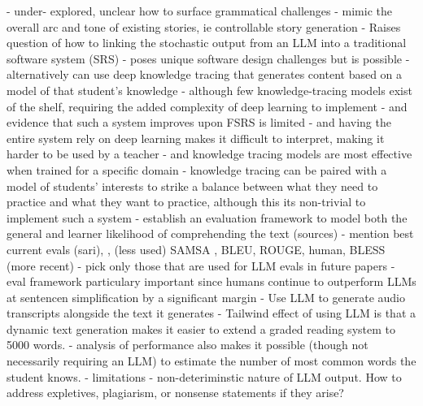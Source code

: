 \documentclass[
	letterpaper, %
]{jdf}
\begin{document}
      - under- explored, unclear how to surface grammatical challenges
    - mimic the overall arc and tone of existing stories, ie controllable story generation \cite{controllable_story_generation}
  - Raises question of how to linking the stochastic output from an LLM into a traditional software system (SRS)
    - poses unique software design challenges but is possible \cite{taiwan_adaptive_testing}
    - alternatively can use deep knowledge tracing \cite{deep_knowledge_tracing} that generates content based on a model of that student's knowledge
      - although few knowledge-tracing models exist of the shelf, requiring the added complexity of deep learning to implement \cite{question_generation_adaptive_education, generative_information_retrieval}
        - and evidence that such a system improves upon FSRS is limited \cite{flashcard_scheduler_evolution}
        - and having the entire system rely on deep learning makes it difficult to interpret, making it harder to be used by a teacher \cite{deep_learning_knowledge_tracing}
        - and knowledge tracing models are most effective when trained for a specific domain \cite{dkt_knowledge_tracing}
      - knowledge tracing can be paired with a model of students' interests to strike a balance between what they need to practice and what they want to practice, although this its non-trivial to implement such a system \cite{llm_augmented_exercise_retrieval}
  - establish an evaluation framework to model both the general and learner likelihood of comprehending the text (sources)
    - mention best current evals (sari), \cite{xu-etal-2016-optimizing}, (less used) SAMSA \cite{sulem-etal-2018-semantic}, BLEU, ROUGE, human, BLESS (more recent) \cite{kew2023bless}
      - pick only those that are used for LLM evals in future papers
      - eval framework particulary important since humans continue to outperform LLMs at sentencen simplification by a significant margin\cite{kew2023bless}
  - Use LLM to generate audio transcripts alongside the text it generates \cite{Chang2015ImprovingRR}
  - Tailwind effect of using LLM is that a dynamic text generation makes it easier to extend a graded reading system to 5000 words.
    - analysis of performance also makes it possible (though not necessarily requiring an LLM) to estimate the number of most common words the student knows.
  - limitations
    - non-deteriminstic nature of LLM output. How to address expletives, plagiarism, or nonsense statements if they arise? \cite{recent_story_generation_review}


\printbibliography{}
\end{document}
